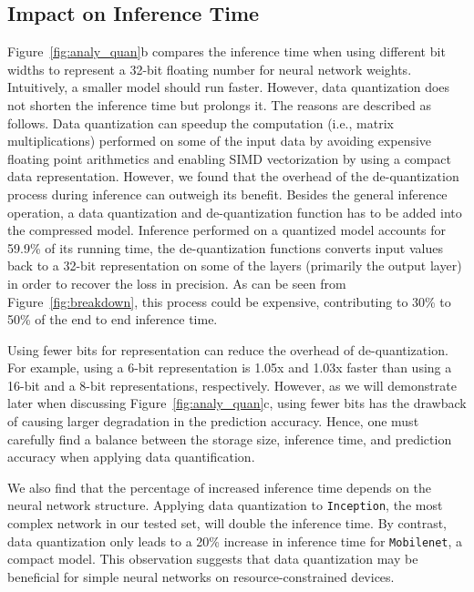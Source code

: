 \subsection{Impact on Inference Time\label{sec:time}}
 Figure~\ref{fig:analy_quan}b compares the inference time when using different bit
widths to represent a 32-bit floating number for neural network weights. Intuitively, a smaller model should run faster. However, data
quantization does not shorten the inference time but prolongs it. The reasons are described as follows. Data quantization can speedup the
computation (i.e., matrix multiplications) performed on some of the input data by avoiding expensive floating point arithmetics and
enabling SIMD vectorization by using a compact data representation. However, we found that the overhead of the de-quantization process
during inference can outweigh its benefit. Besides the general inference operation, a data quantization and de-quantization function has to
be added into the compressed model. Inference performed on a quantized model accounts for 59.9\% of its running time, the de-quantization
functions converts input values back to a 32-bit representation on some of the layers (primarily the output layer) in order to recover the
loss in precision. As can be seen from Figure~\ref{fig:breakdown}, this process could be expensive, contributing to 30\% to 50\% of the end
to end inference time.




Using fewer bits for representation can reduce the overhead of de-quantization. For example, using a 6-bit representation is 1.05x and
1.03x faster than using a 16-bit and a 8-bit representations, respectively. However, as we will demonstrate later when discussing
Figure~\ref{fig:analy_quan}c, using fewer bits has the drawback of causing larger degradation in the prediction accuracy. Hence, one must
carefully find a balance between the storage size, inference time, and prediction accuracy when applying data quantification.

We also find that the percentage of increased inference time depends on the neural network structure. Applying data quantization to
\texttt{Inception}, the most complex network in our \CNN tested set, will double the inference time. By contrast, data quantization only
leads to a 20\% increase in inference time for \texttt{Mobilenet}, a compact model. This observation suggests that data quantization may be
beneficial for simple neural networks on resource-constrained devices.


